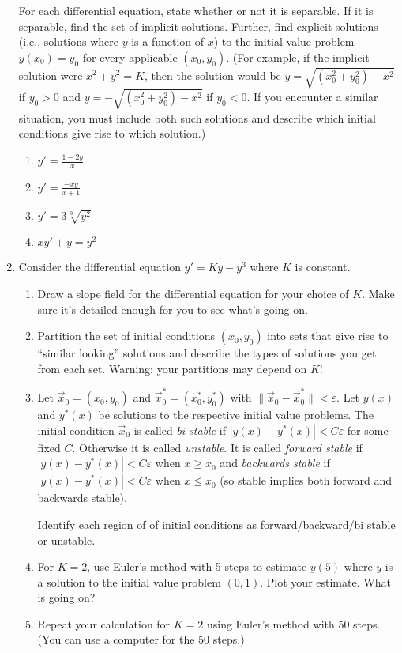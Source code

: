 \documentclass[letter]{article}
\begin{document}
\begin{enumerate}
			For each differential equation, state whether or not it is separable.
			If it is separable, find the set of implicit solutions.
			Further, find explicit solutions (i.e., solutions
			where $y$ is a function of $x$) to the initial value problem $y(x_0)=y_0$
			for every applicable $(x_0,y_0)$.  (For example, if the implicit
			solution were $x^2+y^2=K$, then the solution would be $y=\sqrt{(x_0^2+y_0^2)-x^2}$
			if $y_0> 0$ and $y=-\sqrt{(x_0^2+y_0^2)-x^2}$ if $y_0<0$.  If you encounter
			a similar situation, you must include both such solutions and describe which initial
			conditions give rise to which solution.)
			\begin{enumerate}
				\item $y' = \frac{1-2y}{x}$
				\item $y'=\frac{-xy}{x+1}$
				\item $y' = 3\sqrt[3]{y^2}$
				\item $xy'+y=y^2$
			\end{enumerate}


		\item Consider the differential equation $y'=Ky-y^3$ where $K$ is constant.
		\begin{enumerate}
			\item Draw a slope field for the differential equation for your choice of $K$.  Make sure it's
				detailed enough for you to see what's going on.
			\item Partition the set of initial conditions $(x_0,y_0)$ into sets that
				give rise to ``similar looking'' solutions and describe the types
				of solutions you get from each set.  Warning: your partitions may depend on $K$!
			\item Let $\vec x_0=(x_0,y_0)$ and $\vec x_0^*=(x_0^*,y_0^*)$ with $\|\vec x_0-\vec x_0^*\|<\varepsilon$.
				Let $y(x)$ and $y^*(x)$ be solutions to the respective initial value problems.
				The initial condition $\vec x_0$ is called \emph{bi-stable} if $|y(x)-y^*(x)|<C\varepsilon$
				for some fixed $C$.  Otherwise it is called \emph{unstable}.  
				It is called \emph{forward stable} if $|y(x)-y^*(x)|<C\varepsilon$ when $x\geq x_0$
				and \emph{backwards stable} if $|y(x)-y^*(x)|<C\varepsilon$ when $x\leq x_0$ (so stable implies
				both forward and backwards stable).

				Identify each region of of initial conditions as forward/backward/bi stable or unstable.
			\item  For $K=2$, use Euler's method with 5 steps
				to estimate $y(5)$ where $y$ is a solution
				to the initial value problem $(0,1)$. Plot your estimate.  
				What is going on?
			\item Repeat your calculation for $K=2$ using Euler's method with 50 steps.
				(You can use a computer for the 50 steps.)


\end{enumerate}
\end{enumerate}
\end{document}
